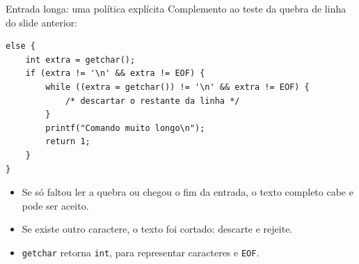 \begin{frame}[fragile]{Entrada longa: uma política explícita}
\small Complemento ao teste da quebra de linha do slide anterior:
\begin{lstlisting}
else {
    int extra = getchar();
    if (extra != '\n' && extra != EOF) {
        while ((extra = getchar()) != '\n' && extra != EOF) {
            /* descartar o restante da linha */
        }
        printf("Comando muito longo\n");
        return 1;
    }
}
\end{lstlisting}
\begin{itemize}
\item Se só faltou ler a quebra ou chegou o fim da entrada, o texto completo cabe e pode ser aceito.
\item Se existe outro caractere, o texto foi cortado: descarte e rejeite.
\item \texttt{getchar} retorna \texttt{int}, para representar caracteres e \texttt{EOF}.
\end{itemize}
\end{frame}
